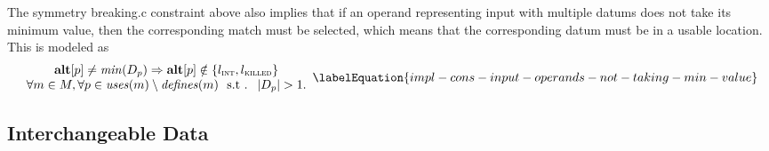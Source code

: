 The \gls{symmetry breaking.c} \gls{constraint} above also implies that if an
\gls{operand} representing input with multiple \glspl{datum} does not take its
minimum value, then the corresponding \gls{match} must be selected, which means
that the corresponding \gls{datum} must be in a usable \gls{location}.
%
This is modeled as
\begin{equation}
  \begin{array}{c}
    \mVar{alt}[p] \neq \mMin(\mDataSet[p])
    \mImp
    \mVar{alt}[p] \notin \mSet{\mIntLocation, \mKilledLocation} \\
    \forall m \in \mMatchSet,
    \forall p \in \mUses(m) \setminus \mDefines(m)
    \text{ \st }
    \mCard{\mDataSet[p]} > 1.
  \end{array}
  \labelEquation{impl-cons-input-operands-not-taking-min-value}
\end{equation}


\subsection{Interchangeable Data}

